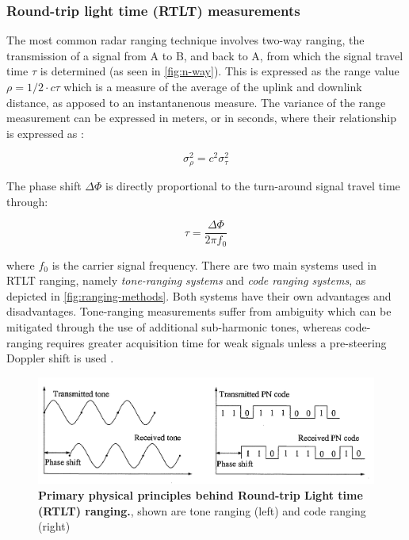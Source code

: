 \subsubsection{Round-trip light time (RTLT) measurements}

The most common radar ranging technique involves two-way ranging, the
transmission of a signal from A to B, and back to A, from which the signal
travel time $\tau$ is determined (as seen in \autoref{fig:n-way}). This is
expressed as the range value $\rho=1/2\cdot{}c\tau$ which is a measure of the
average of the uplink and downlink distance, as apposed to an instantanenous
measure. The variance of the range measurement can be expressed in meters, or in
seconds, where their relationship is expressed as \cite{Berner2002}:

\begin{equation}
    \sigma_{\rho}^2 = c^2\sigma_{\tau}^2
\end{equation}

The phase shift $\Delta\Phi$ is directly proportional to the
turn-around signal travel time through:

\begin{equation}
    \tau = \frac{\Delta\Phi}{2\pi{}f_0}
\end{equation}

where $f_0$ is the carrier signal frequency. There are two main systems used in
RTLT ranging, namely \textit{tone-ranging systems} and \textit{code ranging
    systems}, as depicted in \autoref{fig:ranging-methods}. Both systems have their
own advantages and disadvantages. Tone-ranging measurements suffer from
ambiguity which can be mitigated through the use of additional sub-harmonic
tones, whereas code-ranging requires greater acquisition time for weak signals
unless a pre-steering Doppler shift is used \cite[p.~197]{Montenbruck2000}.

\begin{figure}
    \centering
    \captionsetup{format=hang} %
    \includegraphics[width=1.0\linewidth]{graphics/ranging-method.PNG}
    \caption{
        \textbf{Primary physical principles behind Round-trip Light time (RTLT)
            ranging.}, shown are tone ranging (left) and code ranging (right)
        \cite[p.~196]{Montenbruck2000}
    }
    \label{fig:ranging-methods}
\end{figure}


